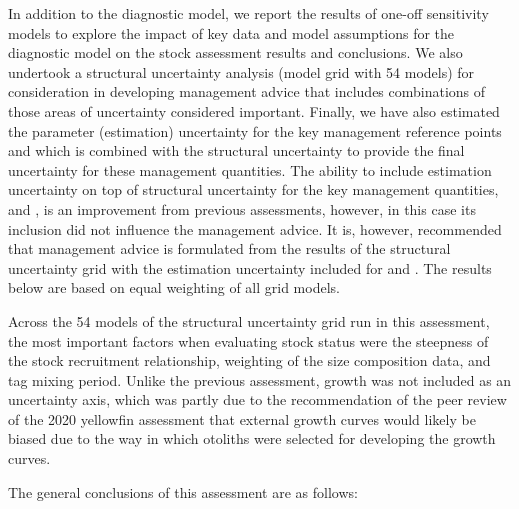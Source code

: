 In addition to the diagnostic model, we report the results of one-off sensitivity models to explore the impact of key data and model assumptions for the diagnostic model on the stock assessment results and conclusions. We also undertook a structural uncertainty analysis (model grid with 54 models) for consideration in developing management advice that includes combinations of those areas of uncertainty considered important. Finally, we have also estimated the parameter (estimation) uncertainty for the key management reference points \sbrsbfo and \fref which is combined with the structural uncertainty to provide the final uncertainty for these management quantities. The ability to include estimation uncertainty on top of structural uncertainty for the key management quantities, \sbrsbfo and \fref, is an improvement from previous assessments, however, in this case its inclusion did not influence the management advice. It is, however, recommended that management advice is formulated from the results of the structural uncertainty grid with the estimation uncertainty included for \sbrsbfo and \fref. The results below are based on equal weighting of all grid models.

Across the 54 models of the structural uncertainty grid run in this assessment, the most important factors when evaluating stock status were the steepness of the stock recruitment relationship, weighting of the size composition data, and tag mixing period. Unlike the previous assessment, growth was not included as an uncertainty axis, which was partly due to the recommendation of the peer review of the 2020 yellowfin assessment that external growth curves would likely be biased due to the way in which otoliths were selected for developing the growth curves.

The general conclusions of this assessment are as follows:

